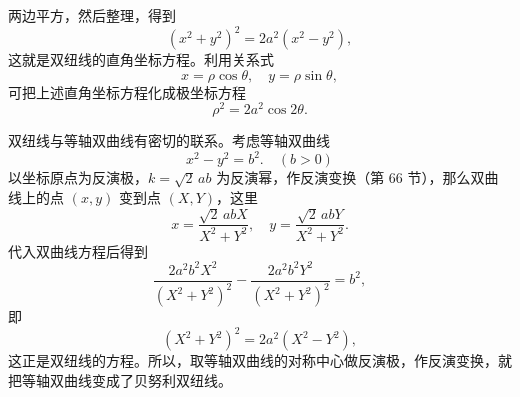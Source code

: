 \noindent 两边平方，然后整理，得到
\[
  (x^2 + y^2)^2 = 2a^2 (x^2 - y^2),
\]
这就是双纽线的直角坐标方程。利用关系式
\[
  x = \rho\cos\theta, \quad y = \rho\sin\theta,
\]
可把上述直角坐标方程化成极坐标方程
\[
  \rho^2 = 2a^2 \cos 2\theta.
\]

双纽线与等轴双曲线有密切的联系。考虑等轴双曲线
\[
  x^2 - y^2 = b^2. \quad (b > 0)
\]
以坐标原点为反演极，$k = \sqrt{2}\,ab$ 为反演幂，作反演变换（第 66 节），那么双曲线上的点 $(x, y)$ 变到点 $(X, Y)$，这里
\[
  x = \frac{\sqrt{2}\,abX}{X^2 + Y^2}, \quad y = \frac{\sqrt{2}\,abY}{X^2 + Y^2}.
\]
代入双曲线方程后得到
\[
  \frac{2a^2 b^2 X^2}{(X^2 + Y^2)^2} - \frac{2a^2 b^2 Y^2}{(X^2 + Y^2)^2} = b^2,
\]
即
\[
  (X^2 + Y^2)^2 = 2a^2 (X^2 - Y^2),
\]
这正是双纽线的方程。所以，取等轴双曲线的对称中心做反演极，作反演变换，就把等轴双曲线变成了贝努利双纽线。
